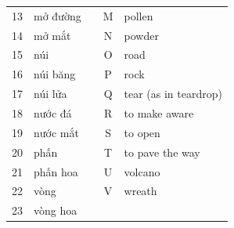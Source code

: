 \documentclass{article}
\begin{document}
\begin{example*}
\begin{otherlanguage}{vietnamese}
\begin{center}
\begin{tabular}{|c|l|c|c|l|}
            13 & mở đường   &  & M & pollen                              \\ \cline{1-2} \cline{4-5} 
            14 & mở mắt     &  & N & powder                              \\ \cline{1-2} \cline{4-5} 
            15 & núi        &  & O & road                                \\ \cline{1-2} \cline{4-5} 
            16 & núi băng   &  & P & rock                                \\ \cline{1-2} \cline{4-5} 
            17 & núi lửa    &  & Q & tear (as in teardrop)               \\ \cline{1-2} \cline{4-5} 
            18 & nước đá    &  & R & to make aware                       \\ \cline{1-2} \cline{4-5} 
            19 & nước mắt   &  & S & to open                             \\ \cline{1-2} \cline{4-5} 
            20 & phấn       &  & T & to pave the way                     \\ \cline{1-2} \cline{4-5} 
            21 & phấn hoa   &  & U & volcano                             \\ \cline{1-2} \cline{4-5} 
            22 & vòng       &  & V & wreath                              \\ \cline{1-2} \cline{4-5} 
            23 & vòng hoa   &  &   &                                     \\ \cline{1-2} \cline{4-5} 
        \end{tabular}
    \end{center}
    
\end{otherlanguage}

\end{example*}

\newpage
\end{document}
